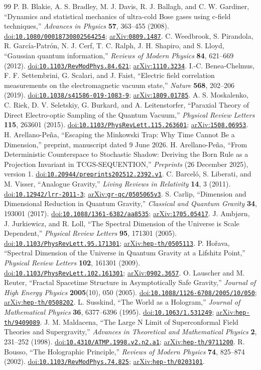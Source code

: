 \documentclass[11pt,a4paper]{article}
\theoremstyle{definition}
\theoremstyle{remark}
\newcommand{\doi}[1]{\href{https://doi.org/#1}{doi:\nolinkurl{#1}}}
\newcommand{\arxiv}[1]{\href{https://arxiv.org/abs/#1}{arXiv:\nolinkurl{#1}}}
\begin{document}
\begin{thebibliography}{99}
 P. B. Blakie, A. S. Bradley, M. J. Davis, R. J. Ballagh, and C. W. Gardiner, ``Dynamics and statistical mechanics of ultra-cold Bose gases using c-field techniques,'' \emph{Advances in Physics} \textbf{57}, 363--455 (2008). \doi{10.1080/00018730802564254}; \arxiv{0809.1487}.
 C. Weedbrook, S. Pirandola, R. Garc\'ia-Patr\'on, N. J. Cerf, T. C. Ralph, J. H. Shapiro, and S. Lloyd, ``Gaussian quantum information,'' \emph{Reviews of Modern Physics} \textbf{84}, 621--669 (2012). \doi{10.1103/RevModPhys.84.621}; \arxiv{1110.3234}.
 I.-C. Benea-Chelmus, F. F. Settembrini, G. Scalari, and J. Faist, ``Electric field correlation measurements on the electromagnetic vacuum state,'' \emph{Nature} \textbf{568}, 202--206 (2019). \doi{10.1038/s41586-019-1083-9}; \arxiv{1809.01785}.
 A. S. Moskalenko, C. Riek, D. V. Seletskiy, G. Burkard, and A. Leitenstorfer, ``Paraxial Theory of Direct Electro-optic Sampling of the Quantum Vacuum,'' \emph{Physical Review Letters} \textbf{115}, 263601 (2015). \doi{10.1103/PhysRevLett.115.263601}; \arxiv{1508.06953}.
 H. Arellano-Pe\~na, ``Escaping the Minkowski Trap: Why Time Cannot Be a Dimension,'' preprint, manuscript dated 9 June 2026.
 H. Arellano-Pe\~na, ``From Deterministic Counterspace to Stochastic Shadow: Deriving the Born Rule as a Projection Invariant in TCGS-SEQUENTION,'' \emph{Preprints} (26 December 2025), version 1. \doi{10.20944/preprints202512.2392.v1}.
 C. Barcel\'o, S. Liberati, and M. Visser, ``Analogue Gravity,'' \emph{Living Reviews in Relativity} \textbf{14}, 3 (2011). \doi{10.12942/lrr-2011-3}; \arxiv{gr-qc/0505065v3}.
 S. Carlip, ``Dimension and Dimensional Reduction in Quantum Gravity,'' \emph{Classical and Quantum Gravity} \textbf{34}, 193001 (2017). \doi{10.1088/1361-6382/aa8535}; \arxiv{1705.05417}.
 J. Ambj\o rn, J. Jurkiewicz, and R. Loll, ``The Spectral Dimension of the Universe is Scale Dependent,'' \emph{Physical Review Letters} \textbf{95}, 171301 (2005). \doi{10.1103/PhysRevLett.95.171301}; \arxiv{hep-th/0505113}.
 P. Ho\v rava, ``Spectral Dimension of the Universe in Quantum Gravity at a Lifshitz Point,'' \emph{Physical Review Letters} \textbf{102}, 161301 (2009). \doi{10.1103/PhysRevLett.102.161301}; \arxiv{0902.3657}.
 O. Lauscher and M. Reuter, ``Fractal Spacetime Structure in Asymptotically Safe Gravity,'' \emph{Journal of High Energy Physics} \textbf{2005}(10), 050 (2005). \doi{10.1088/1126-6708/2005/10/050}; \arxiv{hep-th/0508202}.
 L. Susskind, ``The World as a Hologram,'' \emph{Journal of Mathematical Physics} \textbf{36}, 6377--6396 (1995). \doi{10.1063/1.531249}; \arxiv{hep-th/9409089}.
 J. M. Maldacena, ``The Large N Limit of Superconformal Field Theories and Supergravity,'' \emph{Advances in Theoretical and Mathematical Physics} \textbf{2}, 231--252 (1998). \doi{10.4310/ATMP.1998.v2.n2.a1}; \arxiv{hep-th/9711200}.
 R. Bousso, ``The Holographic Principle,'' \emph{Reviews of Modern Physics} \textbf{74}, 825--874 (2002). \doi{10.1103/RevModPhys.74.825}; \arxiv{hep-th/0203101}.
\end{thebibliography}
\end{document}
